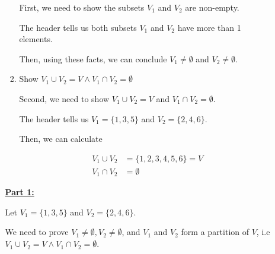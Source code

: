 \documentclass[12pt]{article}
\begin{document}
\begin{enumerate}[a.]
\begin{mdframed}
\begin{enumerate}[1.]
\begin{enumerate}[1.]
                First, we need to show the subsets $V_1$ and $V_2$ are non-empty.

                \begin{mdframed}
                The header tells us both subsets $V_1$ and $V_2$ have more than
                1 elements.

                \bigskip

                Then, using these facts, we can conclude $V_1 \neq \emptyset$ and
                $V_2 \neq \emptyset$.

                \end{mdframed}

                \item Show $V_1 \cup V_2 = V \land V_1 \cap V_2 = \emptyset$

                \bigskip

                Second, we need to show $V_1 \cup V_2 = V$ and $V_1 \cap V_2 = \emptyset$.

                \bigskip

                \begin{mdframed}
                The header tells us $V_1 = \{1,3,5\}$ and $V_2 = \{2,4,6\}$.

                \bigskip

                Then, we can calculate

                \begin{align}
                    V_1 \cup V_2 &= \{1,2,3,4,5,6\} = V\\
                    V_1 \cap V_2 &= \emptyset
                \end{align}

                \end{mdframed}

            \end{enumerate}

            \bigskip

            \begin{mdframed}
            \underline{\textbf{Part 1:}}

            \bigskip

            Let $V_1 = \{1,3,5\}$ and $V_2 = \{2,4,6\}$.

            \bigskip

            We need to prove $V_1 \neq \emptyset, V_2 \neq \emptyset$, and
            $V_1$ and $V_2$ form a partition of $V$, i.e $V_1 \cup V_2 = V
            \land V_1 \cap V_2 = \emptyset$.


\end{mdframed}
\end{enumerate}
\end{mdframed}
\end{enumerate}
\end{document}

